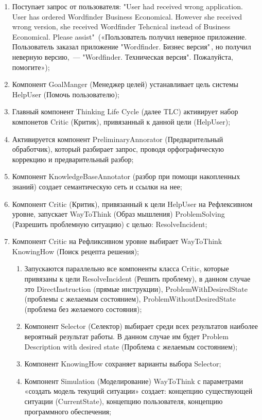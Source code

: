 \begin{enumerate}
	\item Поступает запрос от пользователя: 
	"User had received wrong application. User has ordered Wordfinder Business Economical. However she received wrong version, she received Wordfinder Tehcnical instead of Business Economical. Please assist"\ («Пользователь получил неверное приложение. Пользователь заказал приложение "Wordfinder. Бизнес версия"\,, но получил неверную версию,~--- "Wordfinder. Техническая версия". Пожалуйста, помогите»);
	\item Компонент GoalManger (Менеджер целей) устанавливает цель системы HelpUser (Помочь пользователю);
	\item Главный компонент Thinking Life Cycle (далее TLC) активирует набор компонетов Critic (Критик), привязанный к данной цели (HelpUser); 
	\item Активируется компонент PreliminaryAnnorator (Предварительный обработчик), который разбирает запрос, проводя орфографическую коррекцию и предварительный разбор;
	\item Компонент KnowledgeBaseAnnotator (разбор при помощи накопленных знаний) создает семантическую сеть и ссылки на нее;
	\item Компонент Critic (Критик), привязанный к цели HelpUser на Рефлексивном уровне, запускает WayToThink (Образ мышления) ProblemSolving (Разрешить проблемную ситуацию) с целью: ResolveIncident;
	\item Компонент Critic на Рефликсивном уровне выбирает WayToThink KnowingHow (Поиск рецепта решения);
	\begin{enumerate}
	\item Запускаются параллельно все компоненты класса Critic, которые привязаны к цели ResolveIncident (Решить проблему), в данном случае это DirectInstruction (прямые инструкции), ProblemWithDesiredState (проблемы с желаемым состоянием), ProblemWithoutDesiredState (проблема без желаемого состояния);
	\item Компонент Selector (Селектор) выбирает среди всех результатов наиболее вероятный результат работы. В данном случае им будет Problem Description with desired state (Проблема с желаемым состоянием);
	\item Компонент KnowingHow сохраняет варианты выбора Selector;
	\item Компонент Simulation (Моделирование) WayToThink с параметрами «создать модель текущий ситуации» создает: концепцию существующей ситуации (CurrentState), концепцию пользователя, концепцию программного обеспечения;

\end{enumerate}
\end{enumerate}
